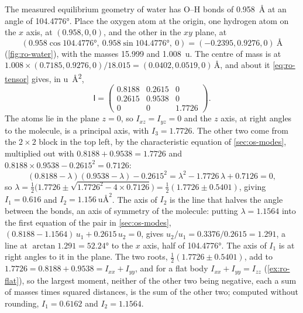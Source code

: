 The measured equilibrium geometry of water\cite{CCCBDB} has O--H bonds of
\SI{0.958}{\angstrom} at an angle of \ang{104.4776}. Place the oxygen atom
at the origin, one hydrogen atom on the $x$ axis, at $(0.958, 0, 0)$, and
the other in the $xy$ plane, at
\begin{equation*}
   (0.958\cos\ang{104.4776},\ 0.958\sin\ang{104.4776},\ 0)
   = (-0.2395, 0.9276, 0)\ \si{\angstrom}
\end{equation*}
(\cref{fig:ro-water}), with the masses 15.999 and \SI{1.008}{\amu}. The
centre of mass is at $1.008\times(0.7185, 0.9276, 0)/18.015 = (0.0402,
0.0519, 0)$\,\si{\angstrom}, and about it
\cref{eq:ro-tensor} gives, in \si{\amu\angstrom\squared},
\begin{equation*}
   \mathsf{I} = \begin{pmatrix}
      0.8188 & 0.2615 & 0\\
      0.2615 & 0.9538 & 0\\
      0 & 0 & 1.7726
   \end{pmatrix} .
\end{equation*}
The atoms lie in the plane $z = 0$, so $I_{xz} = I_{yz} = 0$ and the $z$
axis, at right angles to the molecule, is a principal axis, with $I_3 =
1.7726$. The other two come from the $2\times2$ block in the top left, by
the characteristic equation of \cref{sec:os-modes}, multiplied out with
$0.8188 + 0.9538 = 1.7726$ and $0.8188\times0.9538 - 0.2615^2 = 0.7126$:
\begin{equation*}
   (0.8188 - \lambda)(0.9538 - \lambda) - 0.2615^2
   = \lambda^2 - 1.7726\,\lambda + 0.7126 = 0 ,
\end{equation*}
so $\lambda = \frac12\bigl(1.7726 \pm\sqrt{1.7726^2 - 4\times0.7126}\bigr)
= \frac12(1.7726 \pm 0.5401)$, giving $I_1 = 0.616$ and $I_2 =
\SI{1.156}{\amu\angstrom\squared}$. The axis of $I_2$ is the line that
halves the angle between the bonds, an axis of symmetry of the molecule:
putting $\lambda = 1.1564$ into the first equation of the pair in
\cref{sec:os-modes}, $(0.8188 - 1.1564)\,u_1 + 0.2615\,u_2 = 0$, gives
$u_2/u_1 = 0.3376/0.2615 = 1.291$, a line at $\arctan1.291 = \ang{52.24}$
to the $x$ axis, half of \ang{104.4776}. The axis of $I_1$ is at right
angles to it in the plane. The two roots, $\frac12(1.7726 \pm 0.5401)$,
add to $1.7726 = 0.8188 + 0.9538 = I_{xx} + I_{yy}$, and for a flat body
$I_{xx} + I_{yy} = I_{zz}$ (\cref{ex:ro-flat}), so the largest moment, neither of the other two being negative, each a
sum of masses times squared distances, is
the sum of the other two; computed without rounding, $I_1 = 0.6162$ and
$I_2 = 1.1564$.

